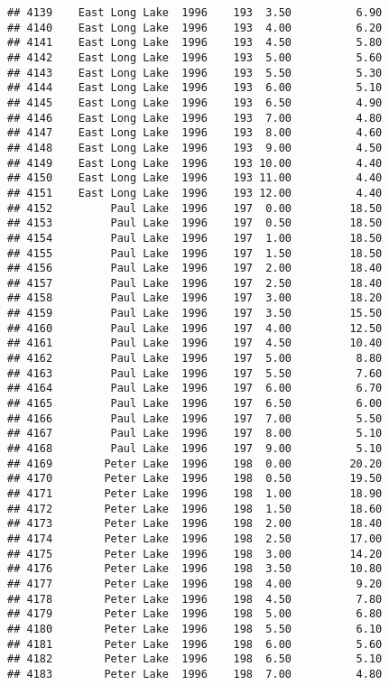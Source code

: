 \documentclass[
]{article}
\begin{document}
\begin{verbatim}
## 4139    East Long Lake  1996    193  3.50          6.90
## 4140    East Long Lake  1996    193  4.00          6.20
## 4141    East Long Lake  1996    193  4.50          5.80
## 4142    East Long Lake  1996    193  5.00          5.60
## 4143    East Long Lake  1996    193  5.50          5.30
## 4144    East Long Lake  1996    193  6.00          5.10
## 4145    East Long Lake  1996    193  6.50          4.90
## 4146    East Long Lake  1996    193  7.00          4.80
## 4147    East Long Lake  1996    193  8.00          4.60
## 4148    East Long Lake  1996    193  9.00          4.50
## 4149    East Long Lake  1996    193 10.00          4.40
## 4150    East Long Lake  1996    193 11.00          4.40
## 4151    East Long Lake  1996    193 12.00          4.40
## 4152         Paul Lake  1996    197  0.00         18.50
## 4153         Paul Lake  1996    197  0.50         18.50
## 4154         Paul Lake  1996    197  1.00         18.50
## 4155         Paul Lake  1996    197  1.50         18.50
## 4156         Paul Lake  1996    197  2.00         18.40
## 4157         Paul Lake  1996    197  2.50         18.40
## 4158         Paul Lake  1996    197  3.00         18.20
## 4159         Paul Lake  1996    197  3.50         15.50
## 4160         Paul Lake  1996    197  4.00         12.50
## 4161         Paul Lake  1996    197  4.50         10.40
## 4162         Paul Lake  1996    197  5.00          8.80
## 4163         Paul Lake  1996    197  5.50          7.60
## 4164         Paul Lake  1996    197  6.00          6.70
## 4165         Paul Lake  1996    197  6.50          6.00
## 4166         Paul Lake  1996    197  7.00          5.50
## 4167         Paul Lake  1996    197  8.00          5.10
## 4168         Paul Lake  1996    197  9.00          5.10
## 4169        Peter Lake  1996    198  0.00         20.20
## 4170        Peter Lake  1996    198  0.50         19.50
## 4171        Peter Lake  1996    198  1.00         18.90
## 4172        Peter Lake  1996    198  1.50         18.60
## 4173        Peter Lake  1996    198  2.00         18.40
## 4174        Peter Lake  1996    198  2.50         17.00
## 4175        Peter Lake  1996    198  3.00         14.20
## 4176        Peter Lake  1996    198  3.50         10.80
## 4177        Peter Lake  1996    198  4.00          9.20
## 4178        Peter Lake  1996    198  4.50          7.80
## 4179        Peter Lake  1996    198  5.00          6.80
## 4180        Peter Lake  1996    198  5.50          6.10
## 4181        Peter Lake  1996    198  6.00          5.60
## 4182        Peter Lake  1996    198  6.50          5.10
## 4183        Peter Lake  1996    198  7.00          4.80

\end{verbatim}
\end{document}

